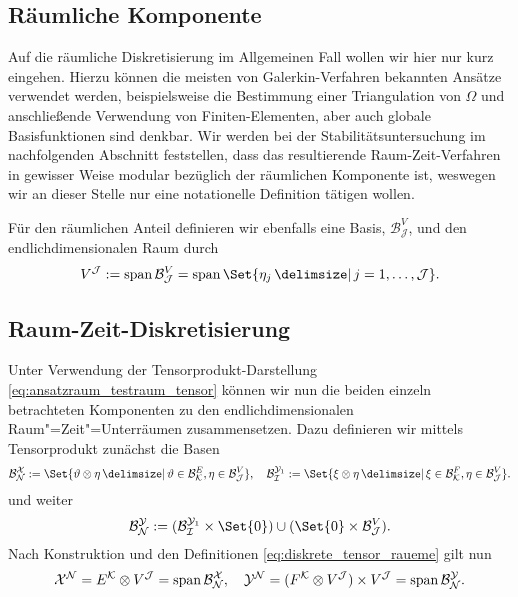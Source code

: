 \documentclass[../main.tex]{subfiles}
\begin{document}
\subsection*{Räumliche Komponente} %

Auf die räumliche Diskretisierung im Allgemeinen Fall wollen wir hier nur kurz eingehen.
Hierzu können die meisten von Galerkin-Verfahren bekannten Ansätze verwendet werden, beispielsweise die Bestimmung einer Triangulation von $\Omega$ und anschließende Verwendung von Finiten-Elementen, aber auch globale Basisfunktionen sind denkbar.
Wir werden bei der Stabilitätsuntersuchung im nachfolgenden Abschnitt feststellen, dass das resultierende Raum-Zeit-Verfahren in gewisser Weise modular bezüglich der räumlichen Komponente ist, weswegen wir an dieser Stelle nur eine notationelle Definition tätigen wollen.

Für den räumlichen Anteil definieren wir ebenfalls eine Basis, $\mathcal B^{V}_{\mathcal J}$, und den endlichdimensionalen Raum durch
\begin{equation}
    \label{eq:raeumlicher_anteil}
    V^{\mathcal J} := \spn \mathcal B^{V}_{\mathcal J} = \spn \Set{ \eta_{j} \given j = 1, \dots, \mathcal J}.
\end{equation}


\subsection*{Raum-Zeit-Diskretisierung} %

Unter Verwendung der Tensorprodukt-Darstellung \cref{eq:ansatzraum_testraum_tensor} können wir nun die beiden einzeln betrachteten Komponenten zu den endlichdimensionalen Raum"=Zeit"=Unterräumen zusammensetzen.
Dazu definieren wir mittels Tensorprodukt zunächst die Basen
\begin{equation}
\label{eq:diskreter_ansatzraum_basis_phi}
\label{eq:diskreter_testraum_basis_psi1}
    \mathcal B^{\mathcal X}_{\mathcal N} := \Set{\theta \otimes \eta \given \theta \in \mathcal B^{E}_{\mathcal K}, \eta \in \mathcal B^{V}_{\mathcal J}}, \quad
    \mathcal B^{\mathcal Y_{1}}_{\mathcal I} := \Set{\xi \otimes \eta \given \xi \in \mathcal B^{F}_{\mathcal K}, \eta \in \mathcal B^{V}_{\mathcal J}}.
\end{equation}
und weiter
\begin{equation}
\label{eq:diskreter_testraum_basis_psi}
    \mathcal B^{\mathcal Y}_{\mathcal N} := (\mathcal B^{\mathcal Y_{1}}_{\mathcal I} \times \Set{ 0 }) \cup (\Set{0} \times \mathcal B^{V}_{\mathcal J}).
\end{equation}
Nach Konstruktion und den Definitionen \cref{eq:diskrete_tensor_raueme} gilt nun
\begin{equation}
    \label{eq:diskreter_ansatz_und_testraum_als_span}
    \mathcal X^{\mathcal N} = E^{\mathcal K} \otimes V^{\mathcal J} = \operatorname{span} \mathcal B^{\mathcal X}_{\mathcal N},
    \quad
    \mathcal Y^{\mathcal N} = (F^{\mathcal K} \otimes V^{\mathcal J}) \times V^{\mathcal J} = \operatorname{span} \mathcal B^{\mathcal Y}_{\mathcal N}.
\end{equation}
\end{document}
